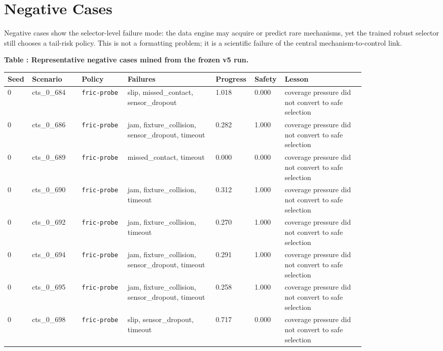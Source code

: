 \documentclass{article}
\begin{document}
\section{Negative Cases}
Negative cases show the selector-level failure mode: the data engine may acquire or predict rare mechanisms, yet the trained robust selector still chooses a tail-risk policy. This is not a formatting problem; it is a scientific failure of the central mechanism-to-control link.

\tiny
\setlength{\tabcolsep}{2pt}
\begin{center}
\label{tab:negcases}\textbf{Table \thetable: Representative negative cases mined from the frozen v5 run.}\\[0.4ex]
\begin{tabular}{p{0.035\linewidth}p{0.13\linewidth}p{0.12\linewidth}p{0.23\linewidth}p{0.055\linewidth}p{0.045\linewidth}p{0.21\linewidth}}
\toprule
Seed & Scenario & Policy & Failures & Progress & Safety & Lesson \\
\midrule
0 & cts\_0\_684 & \texttt{fric-probe} & slip, missed\_contact, sensor\_dropout & 1.018 & 0.000 & coverage pressure did not convert to safe selection \\
0 & cts\_0\_686 & \texttt{fric-probe} & jam, fixture\_collision, sensor\_dropout, timeout & 0.282 & 1.000 & coverage pressure did not convert to safe selection \\
0 & cts\_0\_689 & \texttt{fric-probe} & missed\_contact, timeout & 0.000 & 0.000 & coverage pressure did not convert to safe selection \\
0 & cts\_0\_690 & \texttt{fric-probe} & jam, fixture\_collision, timeout & 0.312 & 1.000 & coverage pressure did not convert to safe selection \\
0 & cts\_0\_692 & \texttt{fric-probe} & jam, fixture\_collision, timeout & 0.270 & 1.000 & coverage pressure did not convert to safe selection \\
0 & cts\_0\_694 & \texttt{fric-probe} & jam, fixture\_collision, sensor\_dropout, timeout & 0.291 & 1.000 & coverage pressure did not convert to safe selection \\
0 & cts\_0\_695 & \texttt{fric-probe} & jam, fixture\_collision, sensor\_dropout, timeout & 0.258 & 1.000 & coverage pressure did not convert to safe selection \\
0 & cts\_0\_698 & \texttt{fric-probe} & slip, sensor\_dropout, timeout & 0.717 & 0.000 & coverage pressure did not convert to safe selection \\

\end{tabular}
\end{center}
\end{document}
